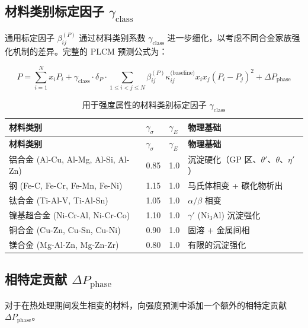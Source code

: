 \documentclass[12pt,a4paper]{article}
\begin{document}
	\subsection{材料类别标定因子 \(\gamma_{\text{class}}\)}
	\label{subsec:material-class-factors}
	
	通用标定因子 \(\beta_{ij}^{(P)}\) 通过材料类别系数 \(\gamma_{\text{class}}\) 进一步细化，以考虑不同合金家族强化机制的差异。完整的 PLCM 预测公式为：
	
	\begin{equation}
		\boxed{P = \sum_{i=1}^{N} x_i P_i + \gamma_{\text{class}} \cdot \delta_P \cdot \sum_{1\le i<j\le N} \beta_{ij}^{(P)} \kappa_{ij}^{\text{(baseline)}} x_i x_j (P_i - P_j)^2 + \Delta P_{\text{phase}}}
		\label{eq:plcm-full-calibration}
	\end{equation}
	
	\begin{longtable}{p{3.5cm}p{2.5cm}p{2.5cm}p{5cm}}
		\caption{用于强度属性的材料类别标定因子 \(\gamma_{\text{class}}\)} \label{tab:material-class-factors} \\
		\toprule
		\textbf{材料类别} & \(\gamma_{\sigma}\) & \(\gamma_{E}\) & \textbf{物理基础} \\
		\midrule
		\endfirsthead
		\toprule
		\textbf{材料类别} & \(\gamma_{\sigma}\) & \(\gamma_{E}\) & \textbf{物理基础} \\
		\midrule
		\endhead
		铝合金 (Al-Cu, Al-Mg, Al-Si, Al-Zn) & 0.85 & 1.0 & 沉淀硬化（GP 区、\(\theta'\)、\(\theta\)、\(\eta'\)） \\
		钢 (Fe-C, Fe-Cr, Fe-Mn, Fe-Ni) & 1.15 & 1.0 & 马氏体相变 + 碳化物析出 \\
		钛合金 (Ti-Al-V, Ti-Al-Sn) & 1.05 & 1.0 & \(\alpha/\beta\) 相变 \\
		镍基超合金 (Ni-Cr-Al, Ni-Cr-Co) & 1.10 & 1.0 & \(\gamma'\) (Ni\(_3\)Al) 沉淀强化 \\
		铜合金 (Cu-Zn, Cu-Sn, Cu-Ni) & 0.90 & 1.0 & 固溶 + 金属间相 \\
		镁合金 (Mg-Al-Zn, Mg-Zn-Zr) & 0.80 & 1.0 & 有限的沉淀强化 \\
		\bottomrule
	\end{longtable}
	
	\subsection{相特定贡献 \(\Delta P_{\text{phase}}\)}
	\label{subsec:phase-contributions}
	
	对于在热处理期间发生相变的材料，向强度预测中添加一个额外的相特定贡献 \(\Delta P_{\text{phase}}\)。
	
\end{document}
